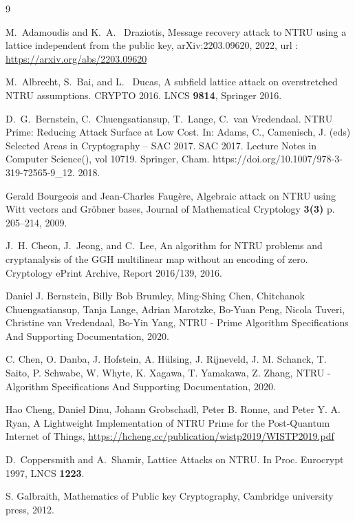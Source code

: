 \documentclass{amsart}
\numberwithin{equation}{section}
\begin{document}
	\begin{thebibliography}{9}
	
 M.~Adamoudis and K.~A.~ Draziotis, Message recovery attack to NTRU using a lattice independent from the public key, arXiv:2203.09620, 2022, url : \url{https://arxiv.org/abs/2203.09620}


 M.~Albrecht, S.~Bai, and L.~ Ducas, A subfield lattice attack on overstretched NTRU assumptions. CRYPTO 2016. LNCS {\bf 9814}, Springer 2016.


 D.~G.~Bernstein, C.~Chuengsatiansup, T.~Lange, C.~van Vredendaal. NTRU Prime: Reducing Attack Surface at Low Cost. In: Adams, C., Camenisch, J. (eds) Selected Areas in Cryptography – SAC 2017. SAC 2017. Lecture Notes in Computer Science(), vol 10719. Springer, Cham. https://doi.org/10.1007/978-3-319-72565-9\_12. 2018.

 Gerald Bourgeois and Jean-Charles Faugère, Algebraic attack on NTRU using Witt vectors and Gröbner bases, Journal of Mathematical Cryptology {\bf 3(3)} p. 205--214, 2009.

 J.~H. Cheon, J.~Jeong, and C.~Lee, An algorithm for NTRU problems and cryptanalysis of the GGH multilinear map without an encoding of zero. Cryptology ePrint Archive, Report 2016/139, 2016. 

 Daniel J. Bernstein, Billy Bob Brumley,  Ming-Shing Chen, Chitchanok Chuengsatiansup, Tanja Lange, Adrian Marotzke,  Bo-Yuan Peng, Nicola Tuveri, Christine van Vredendaal, Bo-Yin Yang, NTRU - Prime Algorithm Specifications And Supporting Documentation, 2020.
		
 C. Chen, O. Danba, J.  Hofstein, A. Hülsing, J. Rijneveld, J. M. Schanck, T. Saito, P. Schwabe, W. Whyte, K. Xagawa, T. Yamakawa, Z. Zhang, NTRU - Algorithm Specifications And Supporting Documentation, 2020.

 Hao Cheng, Daniel Dinu, Johann Grobschadl, Peter B. Ronne, and Peter Y. A. Ryan, A Lightweight Implementation of NTRU Prime for the Post-Quantum Internet of Things, \url{https://hcheng.cc/publication/wistp2019/WISTP2019.pdf}

  D.~Coppersmith  and  A.~Shamir,  Lattice  Attacks  on  NTRU.  In  Proc.  Eurocrypt  1997, LNCS {\bf 1223}. 
 
 
  S. Galbraith, Mathematics of Public key Cryptography, Cambridge university press, 2012.


\end{thebibliography}
\end{document}
